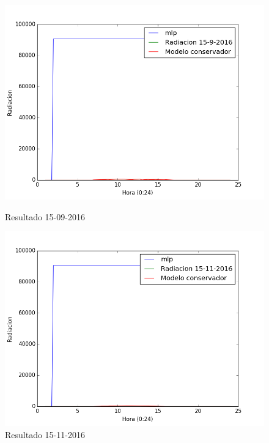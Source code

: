 \begin{figure}[htb]
		\includegraphics[width=\linewidth]{figures/mlp_2016091520160915.png}
		\caption{Resultado 15-09-2016 \label{resultado_mlp_5}}
\endminipage\hfill
{}
		\includegraphics[width=\linewidth]{figures/mlp_2016111520161115.png}
		\caption{Resultado 15-11-2016 \label{resultado_mlp_6}}
\endminipage
\end{figure}
